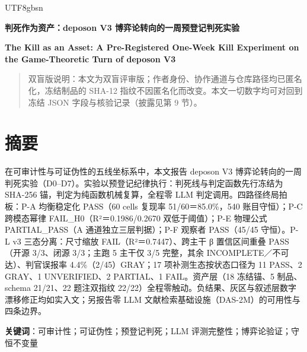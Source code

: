 \documentclass[10pt,a4paper]{article}
\begin{document}
\begin{CJK}{UTF8}{gbsn}
{\centering
{\LARGE\bfseries 判死作为资产：deposon V3 博弈论转向的一周预登记判死实验\par}
\vspace{0.8em}
{\large\bfseries The Kill as an Asset: A Pre-Registered One-Week Kill Experiment on the Game-Theoretic Turn of deposon V3\par}
\vspace{0.2em}
}\par
\vspace{0.3em}
\begin{quote}\small 双盲版说明：本文为双盲评审版；作者身份、协作通道与仓库路径均已匿名化，冻结制品的 SHA-12 指纹不因匿名化而改变。本文一切数字均可对回到冻结 JSON 字段与核验记录（披露见第 9 节）。\end{quote}
\vspace{0.2em}

\section*{摘要}在可审计性与可证伪性的五线坐标系中，本文报告 deposon V3 博弈论转向的一周判死实验（D0–D7）。实验以预登记纪律执行：判死线与判定函数先行冻结为 SHA-256 锚，判定为纯函数机械复算，全程零 LLM 判定调用。四路径终局拍板：P-A 均衡稳定化 PASS（60 cells 复现率 51/60＝85.0\%，540 账目守恒）；P-C 跨模态幂律 FAIL\_H0（R²＝0.1986/0.2670 双低于阈值）；P-E 物理公式 PARTIAL\_PASS（A 通道独立三层判据）；P-F 观察者 PASS（45/45 守恒）。P-L v3 三态分离：尺寸缩放 FAIL（R²＝0.7447）、跨主干 β 置信区间重叠 PASS（开源 3/3、闭源 3/3；主跑 5 主干仅 3/5 完整，其余 INCOMPLETE／不可达）、判官误报率 4.4\%（2/45）GRAY；17 项补测生态按状态口径为 11 PASS、2 GRAY、1 UNVERIFIED、2 PARTIAL、1 FAIL。资产层（18 冻结锚、5 制品、schema 21/21、22 题注双指纹 22/22）全程零触动。负结果、灰区与叙述层数字漂移修正均如实入文；另报告零 LLM 文献检索基础设施（DAS-2M）的可用性与四条边界。

\noindent \textbf{关键词}：可审计性；可证伪性；预登记判死；LLM 评测完整性；博弈论验证；守恒不变量



\end{CJK}
\end{document}

